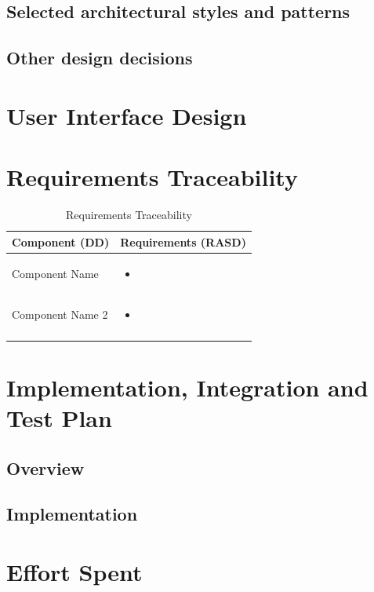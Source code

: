 \documentclass{article}
\begin{document}
	\subsection{Selected architectural styles and patterns}
	
	
	\subsection{Other design decisions}
	

\section{User Interface Design}

\section{Requirements Traceability}
	
	\begin{longtable}{| p{5 cm} | p{8 cm} |} \hline
		Component (DD) & Requirements (RASD)  \\ \hline
		\newline Component Name & 
		\begin{itemize}
			\item 
		\end{itemize}	\\ \hline
		\newline Component Name 2 & 
		\begin{itemize}
			\item  
		\end{itemize}		\\	 \hline				
		\caption{Requirements Traceability}	
		
	\end{longtable}
	
	
\section{Implementation, Integration and Test Plan}
	\subsection{Overview}
		
	\subsection{Implementation}
	
		
\section{Effort Spent}
	
	
\end{document}
